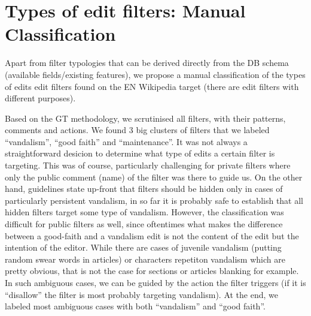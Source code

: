 \begin{comment}
\url{https://en.wikipedia.org/wiki/Wikipedia:Edit_filter}
"Non-admins in good standing who wish to review a proposed but hidden filter may message the mailing list for details."
// what is "good standing"?
// what are the arguments for hiding a filter? --> particularly obnoctious vandals can see how their edits are being filtered and circumvent them; security through obscurity
// are users still informed if their edit triggers a hidden filter? - most certainly; the warnings logic has nothing to do with whether the filter is hidden or not

"For all filters, including those hidden from public view, a brief description of what the rule targets is displayed in the log, the list of active filters, and in any error messages generated by the filter. " //yeah, well, that's the public comment, aka name of the filter

"Be careful not to test sensitive parts of private filters in a public test filter (such as Filter 1): use a private test filter (for example Filter 2) if testing is required."

\end{comment}

\section{Types of edit filters: Manual Classification}

Apart from filter typologies that can be derived directly from the DB schema (available fields/existing features), we propose a manual classification of the types of edits edit filters found on the EN Wikipedia target (there are edit filters with different purposes).

Based on the GT methodology, we scrutinised all filters, with their patterns, comments and actions.
We found 3 big clusters of filters that we labeled ``vandalism'', ``good faith'' and ``maintenance''.
It was not always a straightforward desicion to determine what type of edits a certain filter is targeting.
This was of course, particularly challenging for private filters where only the public comment (name) of the filter was there to guide us.
On the other hand, guidelines state up-front that filters should be hidden only in cases of particularly persistent vandalism, in so far it is probably safe to establish that all hidden filters target some type of vandalism.
However, the classification was difficult for public filters as well, since oftentimes what makes the difference between a good-faith and a vandalism edit is not the content of the edit but the intention of the editor.
While there are cases of juvenile vandalism (putting random swear words in articles) or characters repetiton vandalism which are pretty obvious, that is not the case for sections or articles blanking for example.
In such ambiguous cases, we can be guided by the action the filter triggers (if it is ``disallow'' the filter is most probably targeting vandalism).
At the end, we labeled most ambiguous cases with both ``vandalism'' and ``good faith''.

